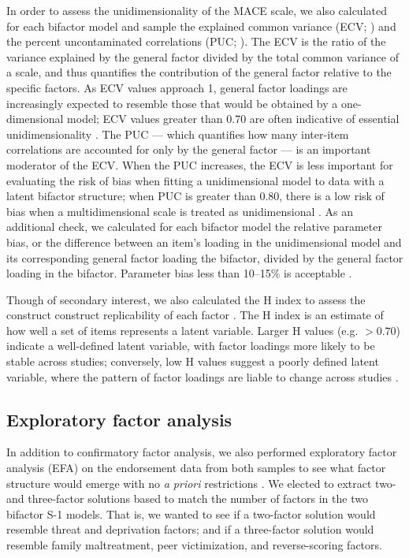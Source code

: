 \documentclass[letterpaper,man,natbib]{apa6}  %
\begin{document}
In order to assess the unidimensionality of the MACE scale, we also calculated for each bifactor model and sample the explained common variance (ECV; \citealt{sijtsma2009use}) and the percent uncontaminated correlations (PUC; \citealt{reise2013multidimensionality}). The ECV is the ratio of the variance explained by the general factor divided by the total common variance of a scale, and thus quantifies the contribution of the general factor relative to the specific factors. As ECV values approach 1, general factor loadings are increasingly expected to resemble those that would be obtained by a one-dimensional model; ECV values greater than 0.70 are often indicative of essential unidimensionality \citep{rodriguez2016applying}. The PUC --- which quantifies how many inter-item correlations are accounted for only by the general factor --- is an important moderator of the ECV. When the PUC increases, the ECV is less important for evaluating the risk of bias when fitting a unidimensional model to data with a latent bifactor structure; when PUC is greater than 0.80, there is a low risk of bias when a multidimensional scale is treated as unidimensional \citep{reise2013multidimensionality}. As an additional check, we calculated for each bifactor model the relative parameter bias, or the difference between an item's loading in the unidimensional  model and its corresponding general factor loading the bifactor, divided by the general factor loading in the bifactor. Parameter bias less than 10–15\% is acceptable \citep{muthen1987structural}.

Though of secondary interest, we also calculated the H index to assess the construct construct replicability of each factor \citep{hancock2001rethinking}. The H index is an estimate of how well a set of items represents a latent variable. Larger H values (e.g. $> 0.70$) indicate a well-defined latent variable, with factor loadings more likely to be stable across studies; conversely, low H values suggest a poorly defined latent variable, where the pattern of factor loadings are liable to change across studies \citep{hancock2001rethinking}.

\subsection{Exploratory factor analysis}

In addition to confirmatory factor analysis, we also performed exploratory factor analysis (EFA) on the endorsement data from both samples to see what factor structure would emerge with no \emph{a priori} restrictions \citep{schmitt2018selecting}. We elected to extract two- and three-factor solutions based to match the number of factors in the two bifactor S-1 models. That is, we wanted to see if a two-factor solution would resemble threat and deprivation factors; and if a three-factor solution would resemble family maltreatment, peer victimization, and reverse-scoring factors. 
\end{document}
